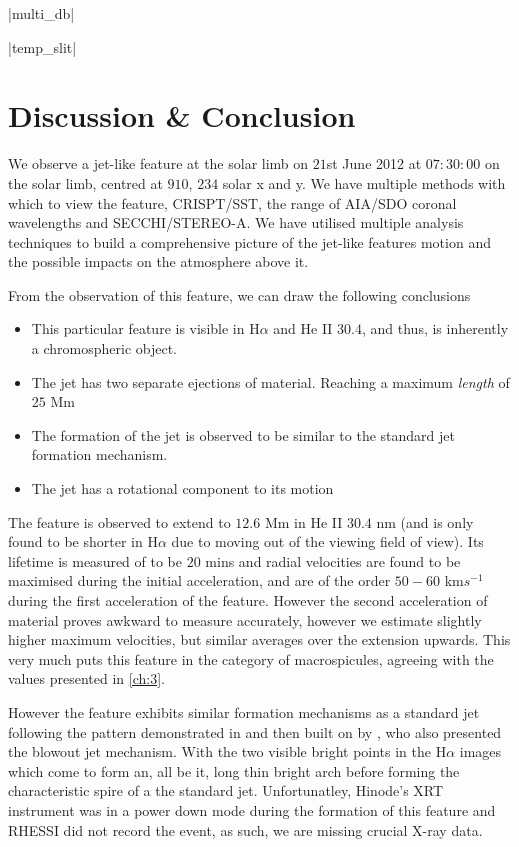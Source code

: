 \py[chapter5]|multi_db|

\py[chapter5]|temp_slit|

\section{Discussion \& Conclusion}
\label{sec:DandC}

We observe a jet-like feature at the solar limb on $21$st June 2012 at $07:30:00$ on the solar limb, centred at $910$, $234$ solar x and y.
We have multiple methods with which to view the feature, CRISPT/SST, the range of AIA/SDO coronal wavelengths and SECCHI/STEREO-A.
We have utilised multiple analysis techniques to build a comprehensive picture of the jet-like features motion and the possible impacts on the atmosphere above it.

From the observation of this feature, we can draw the following conclusions
\begin{itemize}
	\item{This particular feature is visible in H$\alpha$ and He II $30.4$, and thus, is inherently a chromospheric object.}
	\item{The jet has two separate ejections of material. Reaching a maximum \emph{length} of $25$ Mm}
	\item{The formation of the jet is observed to be similar to the standard jet formation mechanism.}
	\item{The jet has a rotational component to its motion}
\end{itemize}

The feature is observed to extend to $12.6$ Mm in He II $30.4$ nm (and is only found to be shorter in H$\alpha$ due to moving out of the viewing field of view).
Its lifetime is measured of to be $20$ mins and radial velocities are found to be maximised during the initial acceleration, and are of the order $50 - 60$ km$s^{-1}$ during the first acceleration of the feature.
However the second acceleration of material proves awkward to measure accurately, however we estimate slightly higher maximum velocities, but similar averages over the extension upwards. 
This very much puts this feature in the category of macrospicules, agreeing with the values presented in \cref{ch:3}.

However the feature exhibits similar formation mechanisms as a standard jet following the pattern demonstrated in \cite{Shibata1992} and then built on by \cite{Moore2010}, who also presented the blowout jet mechanism.
With the two visible bright points in the H$\alpha$ images which come to form an, all be it, long thin bright arch before forming the characteristic spire of a the standard jet.
Unfortunatley, Hinode's XRT instrument was in a power down mode during the formation of this feature and RHESSI did not record the event, as such, we are missing crucial X-ray data.


